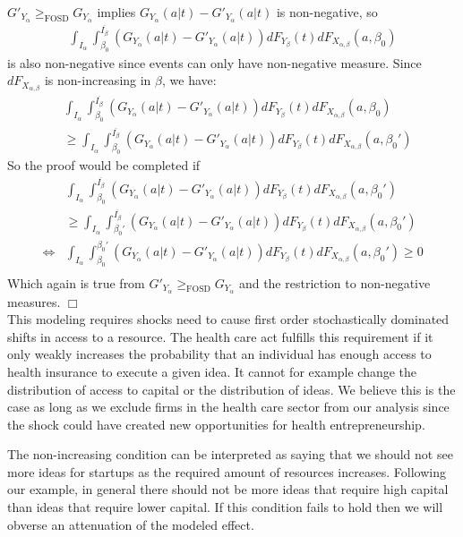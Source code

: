 \documentclass[12pt]{article}
\begin{document}
$G'_{Y_\alpha} \mathop{\ge}_{\text{FOSD}} G_{Y_\alpha}$ implies $G_{Y_{\alpha}}(a|t) - G'_{Y_{\alpha}}(a|t)$ is non-negative, so 
\begin{align*}
\int_{I_{\alpha}} \int_{\beta_0}^{\overline{I_{\beta}}} (G_{Y_{\alpha}}(a|t) - G'_{Y_{\alpha}}(a|t)) dF_{Y_{\beta}}(t) dF_{X_{\alpha,\beta}}(a,\beta_0)
\end{align*}
is also non-negative since events can only have non-negative measure. Since $dF_{X_{\alpha,\beta}}$ is non-increasing in $\beta$, we have: 
\begin{align*}
& \int_{I_{\alpha}} \int_{\beta_0}^{\overline{I_{\beta}}} (G_{Y_{\alpha}}(a|t) - G'_{Y_{\alpha}}(a|t)) dF_{Y_{\beta}}(t) dF_{X_{\alpha,\beta}}(a,\beta_0)\\
& \ge \int_{I_{\alpha}} \int_{\beta_0}^{\overline{I_{\beta}}} (G_{Y_{\alpha}}(a|t) - G'_{Y_{\alpha}}(a|t)) dF_{Y_{\beta}}(t) dF_{X_{\alpha,\beta}}(a,\beta_0')
\end{align*}
So the proof would be completed if
\begin{align*}
& \int_{I_{\alpha}} \int_{\beta_0}^{\overline{I_{\beta}}} (G_{Y_{\alpha}}(a|t) - G'_{Y_{\alpha}}(a|t)) dF_{Y_{\beta}}(t) dF_{X_{\alpha,\beta}}(a,\beta_0') \\
&  \ge  \int_{I_{\alpha}} \int_{\beta_0'}^{\overline{I_{\beta}}} (G_{Y_{\alpha}}(a|t) - G'_{Y_{\alpha}}(a|t)) dF_{Y_{\beta}}(t) dF_{X_{\alpha,\beta}}(a,\beta_0')\\
\iff & \int_{I_{\alpha}} \int_{\beta_0}^{\beta_0'} (G_{Y_{\alpha}}(a|t) - G'_{Y_{\alpha}}(a|t)) dF_{Y_{\beta}}(t) dF_{X_{\alpha,\beta}}(a,\beta_0') \ge 0\\
\end{align*}
Which again is true from $G'_{Y_\alpha} \mathop{\ge}_{\text{FOSD}} G_{Y_\alpha}$ and the restriction to non-negative measures. $\Box$ \\

This modeling requires shocks need to cause first order stochastically dominated shifts in access to a resource. The health care act fulfills this requirement if it only weakly increases the probability that an individual has enough access to health insurance to execute a given idea. It cannot for example change the distribution of access to capital or the distribution of ideas. We believe this is the case as long as we exclude firms in the health care sector from our analysis since the shock could have created new opportunities for health entrepreneurship.  

The non-increasing condition can be interpreted as saying that we should not see more ideas for startups as the required amount of resources increases. Following our example, in general there should not be more ideas that require high capital than ideas that require lower capital. If this condition fails to hold then we will obverse an attenuation of the modeled effect. 
\end{document}
